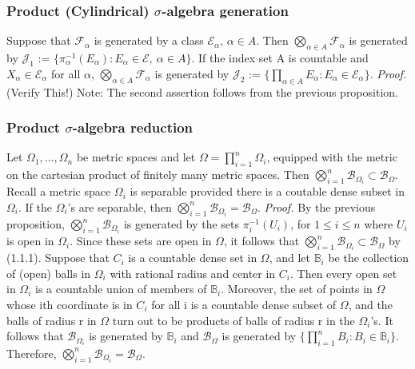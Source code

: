 \documentclass{article}
\begin{document}
\subsubsection{Product (Cylindrical) $\sigma$-algebra generation}
Suppose that $\mathcal{F}_{\alpha}$ is generated by a class $\mathcal{E}_{\alpha}$, $\alpha \in A$. Then $\bigotimes_{\alpha \in A}\mathcal{F}_{\alpha}$ is generated by $\mathcal{J}_1$ := $\{\pi^{-1}_{\alpha}(E_{\alpha}):E_{\alpha}\in \mathcal{E},\ \alpha \in A \}$. If the index set A is countable and $X_{\alpha}\in \mathcal{E}_{\alpha}$ for all $\alpha$, $\bigotimes_{\alpha \in A} \mathcal{F}_{\alpha}$ is generated by $\mathcal{J}_2$ := $\{\prod_{\alpha \in A}E_{\alpha}:E_{\alpha} \in \mathcal{E}_{\alpha} \}.$\newline \newline
\textit{Proof.}\newline \newline
(Verify This!)\newline \newline
Note: The second assertion follows from the previous proposition.

\subsubsection{Product $\sigma$-algebra reduction}
Let $\Omega_1,\ldots,\Omega_n$ be metric spaces and let $\Omega=\prod_{i=1}^n\Omega_i$, equipped with the metric on the cartesian product of finitely many metric spaces. Then $\bigotimes_{i=1}^n\mathcal{B}_{\Omega_i}\subset\mathcal{B}_{\Omega}$. Recall a metric space $\Omega_i$ is separable provided there is a coutable dense subset in $\Omega_i$. If the $\Omega_i$'s are separable, then $\bigotimes_{i=1}^n\mathcal{B}_{\Omega_i}= \mathcal{B}_{\Omega}$.\newline \newline
\textit{Proof.}\newline \newline
By the previous proposition, $\bigotimes_{i=1}^n\mathcal{B}_{\Omega_i}$ is generated by the sets $\pi_i^{-1}(U_i)$, for $1\leq i \leq n$ where $U_i$ is open in $\Omega_i$. Since these sets are open in $\Omega$, it follows that  $\bigotimes_{i=1}^n\mathcal{B}_{\Omega_i}\subset\mathcal{B}_{\Omega}$ by (1.1.1). Suppose that $C_i$ is a countable dense set in $\Omega$, and let $\mathbb{B}_i$ be the collection of (open) balls in $\Omega_i$ with rational radius and center in $C_i$. Then every open set in $\Omega_i$ is a countable union of members of $\mathbb{B}_i$. Moreover, the set of points in $\Omega$ whose ith coordinate is in $C_i$ for all i is a countable dense subset of $\Omega$, and the balls of radius r in $\Omega$ turn out to be products of balls of radius r in the $\Omega_i$'s. It follows that $\mathcal{B}_{\Omega_i}$ is generated by $\mathbb{B}_i$ and $\mathcal{B}_{\Omega}$ is generated by $\{\prod_{i=1}^nB_i:B_i\in\mathbb{B}_i\}$. Therefore, $\bigotimes_{i=1}^n\mathcal{B}_{\Omega_i}=\mathcal{B}_{\Omega}$.
\end{document}
